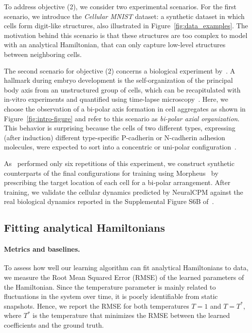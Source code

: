 To address objective (2), we consider two experimental scenarios. For the first scenario, we introduce the \emph{Cellular MNIST} dataset: a synthetic dataset in which cells form digit-like structures, also illustrated in Figure~\ref{fig:data_examples}. The motivation behind this scenario is that these structures are too complex to model with an analytical Hamiltonian, that can only capture low-level structures between neighboring cells. 


The second scenario for objective (2) concerns a biological experiment by~\citet{Toda2018Science}.
A hallmark during embryo development is the self-organization of the principal body axis from an unstructured group of cells, which can be recapitulated with in-vitro experiments and quantified using time-lapse microscopy~\cite{Toda2018Science}. 
Here, we choose the observation of a bi-polar axis formation in cell aggregates as shown in Figure~\ref{fig:intro-figure} and refer to this scenario as \emph{bi-polar axial organization}.
This behavior is surprising because the cells of two different types, expressing (after induction) different type-specific P-cadherin or N-cadherin adhesion molecules, were expected to sort into a concentric or uni-polar configuration~\cite{Graner1992}.

As~\citet{Toda2018Science} performed only six repetitions of this experiment, we construct synthetic counterparts of the final configurations for training using Morpheus~\cite{starruss2014morpheus} by prescribing the target location of each cell for a bi-polar arrangement. After training, we validate the cellular dynamics predicted by NeuralCPM against the real biological dynamics reported in the Supplemental Figure S6B of~\citet{Toda2018Science}. 








\subsection{Fitting analytical Hamiltonians}\label{sec:exp0}



\paragraph{Metrics and baselines.} To assess how well our learning algorithm can fit analytical Hamiltonians to data, we measure the Root Mean Squared Error (RMSE) of the learned parameters of the Hamiltonian. Since the temperature parameter is mainly related to fluctuations in the system over time, it is poorly identifiable from static snapshots. Hence, we report the RMSE for both temperatures $T=1$ and $T=T^*$, where $T^*$ is the temperature that minimizes the RMSE between the learned coefficients and the ground truth. 


